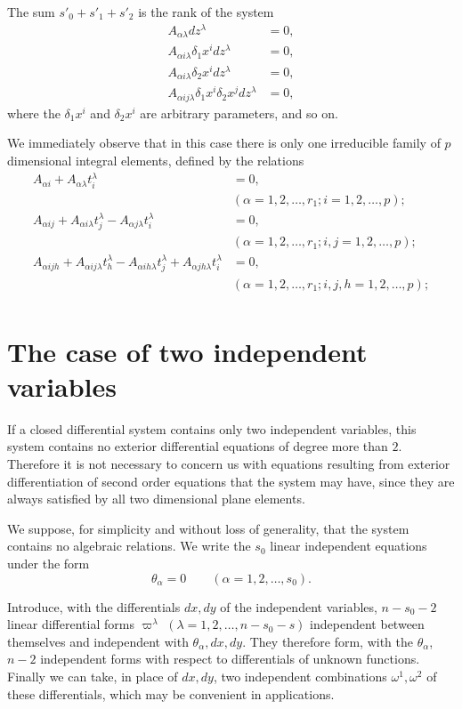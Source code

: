 The sum $s'_{0}+s'_{1}+s'_{2}$ is the rank of the system
\begin{align*}
  A_{\alpha\lambda}dz^{\lambda}&=0,\\
  A_{\alpha i \lambda}\delta_{1}x^{i}dz^{\lambda}&=0,\\
  A_{\alpha i \lambda}\delta_{2}x^{i}dz^{\lambda}&=0,\\
  A_{\alpha ij\lambda}\delta_{1}x^{i}\delta_{2}x^{j}dz^{\lambda}&=0,
\end{align*}
where the $\delta_{1}x^{i}$ and $\delta_{2}x^{i}$ are arbitrary parameters, and so on.

We immediately observe that in this case there is only one irreducible family of $p$ dimensional integral elements, defined by the relations
\begin{align*}
  A_{\alpha i}+A_{\alpha\lambda}t_{i}^{\lambda}&=0,\\
  &(\alpha=1,2,\dots,r_{1};i=1,2,\dots,p);\\
  A_{\alpha ij}+A_{\alpha i\lambda}t_{j}^{\lambda}-A_{\alpha j\lambda}t_{i}^{\lambda}&=0,\\
  &(\alpha=1,2,\dots,r_{1};i,j=1,2,\dots,p);\\
  A_{\alpha ijh}+A_{\alpha ij\lambda}t_{h}^{\lambda}-A_{\alpha ih\lambda}t_{j}^{\lambda}+A_{\alpha jh\lambda}t_{i}^{\lambda}&=0,\\
  &(\alpha=1,2,\dots,r_{1};i,j,h=1,2,\dots,p);\\
\end{align*}

\section{The case of two independent variables}
\label{sec:case-two-independent}

\fsec If a closed differential system contains only two independent variables, this system contains no exterior differential equations of degree more than $2$. Therefore it is not necessary to concern us with equations resulting from exterior differentiation of second order equations that the system may have, since they are always satisfied by all two dimensional plane elements.

We suppose, for simplicity and without loss of generality, that the system contains no algebraic relations. We write the $s_{0}$ linear independent equations under the form
\[
\theta_{\alpha}=0\qquad(\alpha=1,2,\dots,s_{0}).
\]

Introduce, with the differentials $dx, dy$ of the independent variables, $n-s_{0}-2$ linear differential forms $\varpi^{\lambda}$ $(\lambda=1,2,\dots,n-s_{0}-s)$ independent between themselves and independent with $\theta_{\alpha},dx,dy$. They therefore form, with the $\theta_{\alpha}$, $n-2$ independent forms with respect to differentials of unknown functions. Finally we can take, in place of $dx,dy$, two independent combinations $\omega^{1},\omega^{2}$ of these differentials, which may be convenient in applications.

